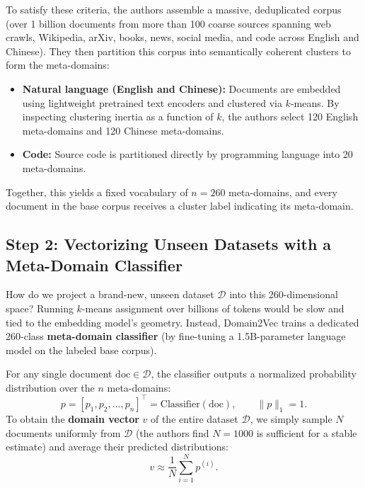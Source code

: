 \documentclass[12pt]{article}
\begin{document}
To satisfy these criteria, the authors assemble a massive, deduplicated corpus (over 1 billion documents from more than 100 coarse sources spanning web crawls, Wikipedia, arXiv, books, news, social media, and code across English and Chinese). They then partition this corpus into semantically coherent clusters to form the meta-domains:
\begin{itemize}
    \item \textbf{Natural language (English and Chinese):} Documents are embedded using lightweight pretrained text encoders and clustered via $k$-means. By inspecting clustering inertia as a function of $k$, the authors select 120 English meta-domains and 120 Chinese meta-domains.
    \item \textbf{Code:} Source code is partitioned directly by programming language into 20 meta-domains.
\end{itemize}
Together, this yields a fixed vocabulary of $n = 260$ meta-domains, and every document in the base corpus receives a cluster label indicating its meta-domain.

\subsection*{Step 2: Vectorizing Unseen Datasets with a Meta-Domain Classifier}

How do we project a brand-new, unseen dataset $\mathcal{D}$ into this 260-dimensional space? Running $k$-means assignment over billions of tokens would be slow and tied to the embedding model's geometry. Instead, Domain2Vec trains a dedicated 260-class \textbf{meta-domain classifier} (by fine-tuning a 1.5B-parameter language model on the labeled base corpus).

For any single document $\text{doc} \in \mathcal{D}$, the classifier outputs a normalized probability distribution over the $n$ meta-domains:
\begin{equation}
p = [p_1, p_2, \dots, p_n]^\top = \mathrm{Classifier}(\text{doc}), \qquad \|p\|_1 = 1.
\label{eq:doc_vec}
\end{equation}
To obtain the \textbf{domain vector} $v$ of the entire dataset $\mathcal{D}$, we simply sample $N$ documents uniformly from $\mathcal{D}$ (the authors find $N = 1000$ is sufficient for a stable estimate) and average their predicted distributions:
\begin{equation}
v \approx \frac{1}{N} \sum_{i=1}^{N} p^{(i)}.
\label{eq:dataset_vec}
\end{equation}
\end{document}
